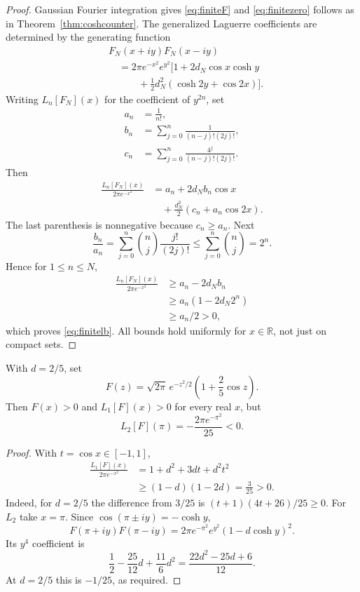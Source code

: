 \begin{proof}
Gaussian Fourier integration gives
\eqref{eq:finiteF} and
\eqref{eq:finitezero} follows as in
Theorem~\ref{thm:coshcounter}.
The generalized Laguerre coefficients
are determined by the generating function
\begin{align*}
&F_N(x+iy)F_N(x-iy)\\
&\quad=2\pi e^{-x^2}e^{y^2}
\bigl[1+2d_N\cos x\cosh y\\
&\qquad\quad+\tfrac12d_N^2(\cosh 2y+\cos 2x)\bigr].
\end{align*}
Writing $L_n[F_N](x)$ for the
coefficient of $y^{2n}$, set
\begin{align*}
a_n&=\frac1{n!},\\
b_n&=\sum_{j=0}^n
  \frac1{(n-j)!(2j)!},\\
c_n&=\sum_{j=0}^n
  \frac{4^j}{(n-j)!(2j)!}.
\end{align*}
Then
\begin{align}\label{eq:finitecoefs}
\frac{L_n[F_N](x)}{2\pi e^{-x^2}}
&=a_n+2d_Nb_n\cos x\nonumber\\
&\quad+\frac{d_N^2}{2}
\left(c_n+a_n\cos 2x\right).
\end{align}
The last parenthesis is nonnegative
because $c_n\ge a_n$. Next
\[
\frac{b_n}{a_n}
=\sum_{j=0}^n
\binom nj\frac{j!}{(2j)!}
\le\sum_{j=0}^n\binom nj=2^n.
\]
Hence for $1\le n\le N$,
\begin{align*}
\frac{L_n[F_N](x)}{2\pi e^{-x^2}}
&\ge a_n-2d_Nb_n\\
&\ge a_n(1-2d_N2^n)\\
&\ge a_n/2>0,
\end{align*}
which proves \eqref{eq:finitelb}.
All bounds hold uniformly for
$x\in\mathbb R$, not just on compact sets.
\end{proof}

\begin{proposition}
\label{prop:firstsecond}
With $d=2/5$, set
\[
F(z)=\sqrt{2\pi}\,e^{-z^2/2}
\left(1+\frac25\cos z\right).
\]
Then $F(x)>0$ and $L_1[F](x)>0$
for every real $x$, but
\begin{equation}
\boxed{L_2[F](\pi)=
-\frac{2\pi e^{-\pi^2}}{25}<0.}
\end{equation}
\end{proposition}
\begin{proof}
With $t=\cos x\in[-1,1]$,
\begin{align*}
\frac{L_1[F](x)}{2\pi e^{-x^2}}
&=1+d^2+3dt+d^2t^2\\
&\ge (1-d)(1-2d)=\frac3{25}>0.
\end{align*}
Indeed, for $d=2/5$ the difference
from $3/25$ is
$(t+1)(4t+26)/25\ge0$.
For $L_2$ take $x=\pi$.
Since $\cos(\pi\pm iy)=-\cosh y$,
\[
F(\pi+iy)F(\pi-iy)
=2\pi e^{-\pi^2}e^{y^2}
(1-d\cosh y)^2.
\]
Its $y^4$ coefficient is
\[
\frac12-\frac{25}{12}d+
\frac{11}{6}d^2
=\frac{22d^2-25d+6}{12}.
\]
At $d=2/5$ this is $-1/25$,
as required.
\end{proof}

